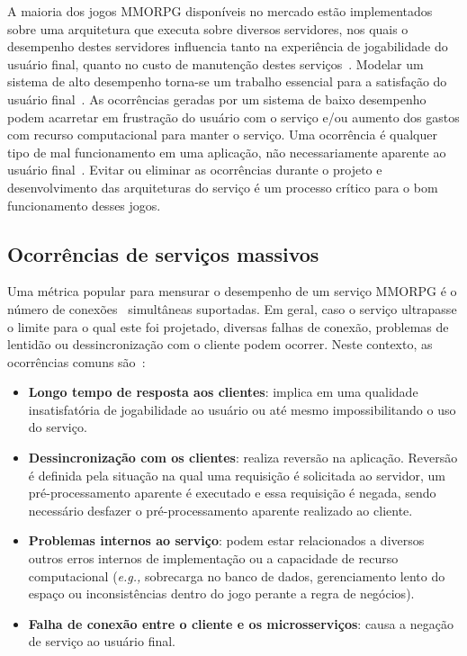 A maioria dos jogos \ac{MMORPG} disponíveis no mercado estão implementados sobre uma arquitetura que executa sobre diversos servidores\cite{stephenclarkewillson2017}, nos quais o desempenho destes servidores influencia tanto na experiência de jogabilidade do usuário final, quanto no custo de manutenção destes serviços~\cite{1417630}.
%
Modelar um sistema de alto desempenho torna-se um trabalho essencial para a satisfação do usuário final~\cite{1417630}.
%
As ocorrências geradas por um sistema de baixo desempenho podem acarretar em frustração do usuário com o serviço e/ou aumento dos gastos com recurso computacional para manter o serviço.
%
Uma ocorrência é qualquer tipo de mal funcionamento em uma aplicação, não necessariamente aparente ao usuário final~\cite{1417630}.
%
Evitar ou eliminar as ocorrências durante o projeto e desenvolvimento das arquiteturas do serviço é um processo crítico para o bom funcionamento desses jogos.

\subsection{Ocorrências de serviços massivos}
\label{sec:ocorrencias}

Uma métrica popular para mensurar o desempenho de um serviço \ac{MMORPG} é o número de conexões~\cite{1417630} simultâneas suportadas.
%
Em geral, caso o serviço ultrapasse o limite para o qual este foi projetado, diversas falhas de conexão, problemas de lentidão ou dessincronização com o cliente podem ocorrer.
%
Neste contexto, as ocorrências comuns são~\cite{1417630}:

\begin{itemize}
  \item \textbf{Longo tempo de resposta aos clientes}: implica em uma qualidade insatisfatória de jogabilidade ao usuário ou até mesmo impossibilitando o uso do serviço.
  \item \textbf{Dessincronização com os clientes}: realiza reversão na aplicação. Reversão é definida pela situação na qual uma requisição é solicitada ao servidor, um pré-processamento aparente é executado e essa requisição é negada, sendo necessário desfazer o pré-processamento aparente realizado ao cliente.
  \item \textbf{Problemas internos ao serviço}:  podem estar relacionados a diversos outros erros internos de implementação ou a capacidade de recurso computacional (\textit{e.g.,} sobrecarga no banco de dados, gerenciamento lento do espaço ou inconsistências dentro do jogo perante a regra de negócios).
  \item \textbf{Falha de conexão entre o cliente e os microsserviços}: causa a negação de serviço ao usuário final.
\end{itemize}

